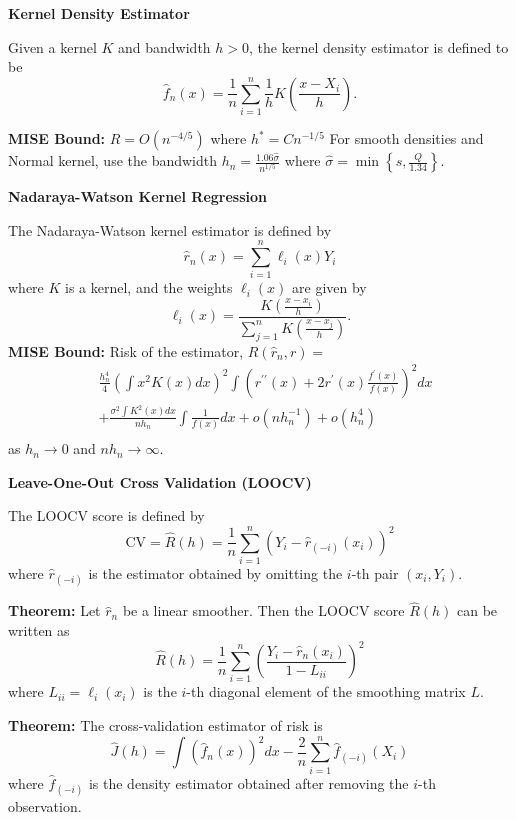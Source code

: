 \documentclass[a4paper]{article}
\newcommand{\subheading}[1]{{\scriptsize\textbf{#1}}}
\begin{document}
\begin{multicols*}{4}
\subheading{Kernel Density Estimator}

Given a kernel $K$ and bandwidth $h > 0$, the kernel density estimator is defined to be
$$
\widehat{f}_n(x)=\frac{1}{n} \sum_{i=1}^n \frac{1}{h} K\left(\frac{x-X_i}{h}\right) .
$$

\textbf{MISE Bound:} $R=O(n^{-4/5})$ where $h^* = Cn^{-1/5}$
For smooth densities and Normal kernel, use the bandwidth
$
h_n=\frac{1.06 \widehat{\sigma}}{n^{1 / 5}}
$
where
$
\widehat{\sigma}=\min \left\{s, \frac{Q}{1.34}\right\} .
$

\subheading{Nadaraya-Watson Kernel Regression}

The Nadaraya-Watson kernel estimator is defined by
$$
\widehat{r}_n(x)=\sum_{i=1}^n \ell_i(x) Y_i
$$
where $K$ is a kernel, and the weights $\ell_i(x)$ are given by
$$
\ell_i(x)=\frac{K\left(\frac{x-x_i}{h}\right)}{\sum_{j=1}^n K\left(\frac{x-x_j}{h}\right)} .
$$
\smallskip
\textbf{MISE Bound:} Risk of the estimator, $R(\widehat{r}_n, r) =$
$$
\begin{aligned}
&\frac{h_n^4}{4} (\int x^2 K(x) d x)^2\int(r^{\prime \prime}(x) +2 r^{\prime}(x) \frac{f^{\prime}(x)}{f(x)})^2 d x\\
&+\frac{\sigma^2 \int K^2(x) d x}{n h_n} \int \frac{1}{f(x)} d x+o\left(n h_n^{-1}\right)+o\left(h_n^4\right) \\
\end{aligned}
$$
as $h_n \rightarrow 0$ and $n h_n \rightarrow \infty$.

\smallskip
\hline
\smallskip

\subheading{Leave-One-Out Cross Validation (LOOCV)}

The LOOCV score is defined by
$$
\mathrm{CV}=\widehat{R}(h)=\frac{1}{n} \sum_{i=1}^n\left(Y_i-\widehat{r}_{(-i)}\left(x_i\right)\right)^2
$$
where $\widehat{r}_{(-i)}$ is the estimator obtained by omitting the $i$-th pair $\left(x_i, Y_i\right)$.
\smallskip

\textbf{Theorem:} Let $\widehat{r}_n$ be a linear smoother. Then the LOOCV score $\widehat{R}(h)$ can be written as
$$
\widehat{R}(h)=\frac{1}{n} \sum_{i=1}^n\left(\frac{Y_i-\widehat{r}_n\left(x_i\right)}{1-L_{i i}}\right)^2
$$
where $L_{i i}=\ell_i\left(x_i\right)$ is the $i$-th diagonal element of the smoothing matrix $L$.
\smallskip

\textbf{Theorem:} The cross-validation estimator of risk is
$$
\widehat{J}(h)=\int\left(\widehat{f}_n(x)\right)^2 d x-\frac{2}{n} \sum_{i=1}^n \widehat{f}_{(-i)}\left(X_i\right)
$$
where $\widehat{f}_{(-i)}$ is the density estimator obtained after removing the $i$-th observation. 


\end{multicols*}
\end{document}
